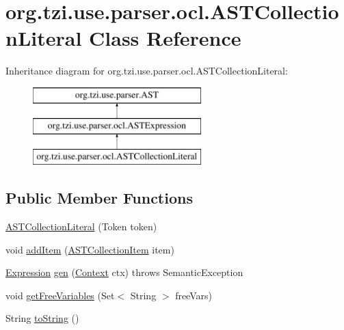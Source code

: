 \hypertarget{classorg_1_1tzi_1_1use_1_1parser_1_1ocl_1_1_a_s_t_collection_literal}{\section{org.\-tzi.\-use.\-parser.\-ocl.\-A\-S\-T\-Collection\-Literal Class Reference}
\label{classorg_1_1tzi_1_1use_1_1parser_1_1ocl_1_1_a_s_t_collection_literal}
}
Inheritance diagram for org.\-tzi.\-use.\-parser.\-ocl.\-A\-S\-T\-Collection\-Literal\-:\begin{figure}[H]
\begin{center}
\leavevmode
\includegraphics[height=3.000000cm]{classorg_1_1tzi_1_1use_1_1parser_1_1ocl_1_1_a_s_t_collection_literal}
\end{center}
\end{figure}
\subsection*{Public Member Functions}
\begin{DoxyCompactItemize}
\item 
\hyperlink{classorg_1_1tzi_1_1use_1_1parser_1_1ocl_1_1_a_s_t_collection_literal_aac17586f6a1fd28a1fcbf4a212fa811b}{A\-S\-T\-Collection\-Literal} (Token token)
\item 
void \hyperlink{classorg_1_1tzi_1_1use_1_1parser_1_1ocl_1_1_a_s_t_collection_literal_acebfe6e4a1d007edf7e87b5d458483e4}{add\-Item} (\hyperlink{classorg_1_1tzi_1_1use_1_1parser_1_1ocl_1_1_a_s_t_collection_item}{A\-S\-T\-Collection\-Item} item)
\item 
\hyperlink{classorg_1_1tzi_1_1use_1_1uml_1_1ocl_1_1expr_1_1_expression}{Expression} \hyperlink{classorg_1_1tzi_1_1use_1_1parser_1_1ocl_1_1_a_s_t_collection_literal_ae6edfbe181dcf536a4e5fd05bfe45805}{gen} (\hyperlink{classorg_1_1tzi_1_1use_1_1parser_1_1_context}{Context} ctx)  throws Semantic\-Exception 
\item 
void \hyperlink{classorg_1_1tzi_1_1use_1_1parser_1_1ocl_1_1_a_s_t_collection_literal_a47371a8c92c1f8f3ab3cc3a79f68e533}{get\-Free\-Variables} (Set$<$ String $>$ free\-Vars)
\item 
String \hyperlink{classorg_1_1tzi_1_1use_1_1parser_1_1ocl_1_1_a_s_t_collection_literal_ab6928aee7a09c64d756f7d7b39595c5a}{to\-String} ()
\end{DoxyCompactItemize}
